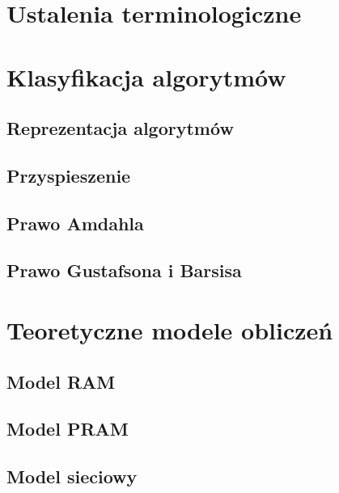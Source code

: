 \section{Ustalenia terminologiczne}


\newpage

\section{Klasyfikacja algorytmów}


\subsection{Reprezentacja algorytmów}



\subsection{Przyspieszenie}


\subsection{Prawo Amdahla}



\subsection{Prawo Gustafsona i Barsisa}


\newpage

\section{Teoretyczne modele obliczeń}

\subsection{Model RAM}


\label{subsec:PRAM}
\subsection{Model PRAM}


\subsection{Model sieciowy}

